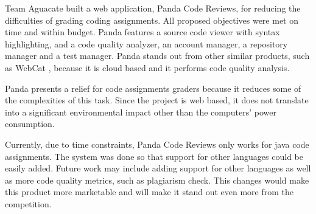 
Team Aguacate built a web application, Panda Code Reviews, for reducing the difficulties of grading coding assignments. All proposed objectives were met on time and within budget. Panda features a source code viewer with syntax highlighting, and a code quality analyzer, an account manager, a repository manager and a test manager. Panda stands out from other similar products, such as WebCat \cite{WebCat}, because it is cloud based and it performs code quality analysis.

Panda presents a relief for code assignments graders because it reduces some of the complexities of this task. Since the project is web based, it does not translate into a significant environmental impact other than the computers' power consumption.

Currently, due to time constraints, Panda Code Reviews only works for java code assignments. The system was done so that support for other languages could be easily added. Future work may include adding support for other languages as well as more code quality metrics, such as plagiarism check. This changes would make this product more marketable and will make it stand out even more from the competition.
